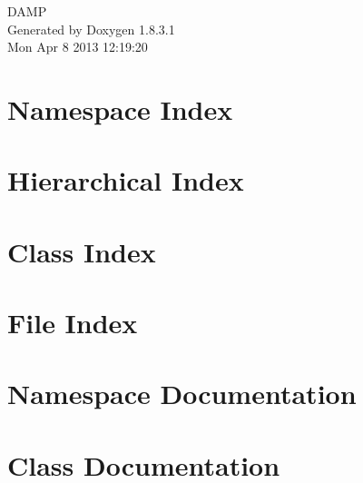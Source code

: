 \documentclass{book}
\begin{document}
\hypersetup{pageanchor=false,citecolor=blue}
\begin{titlepage}
\vspace*{7cm}
\begin{center}
{\Large D\-A\-M\-P }\\
\vspace*{1cm}
{\large Generated by Doxygen 1.8.3.1}\\
\vspace*{0.5cm}
{\small Mon Apr 8 2013 12:19:20}\\
\end{center}
\end{titlepage}
\clearemptydoublepage
{}
\tableofcontents
\clearemptydoublepage
{}
\hypersetup{pageanchor=true,citecolor=blue}
\chapter{Namespace Index}

\chapter{Hierarchical Index}

\chapter{Class Index}

\chapter{File Index}

\chapter{Namespace Documentation}

\chapter{Class Documentation}





























\end{document}
